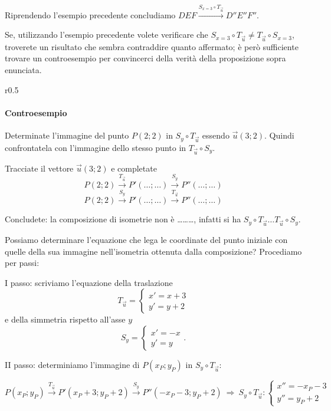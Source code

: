 Riprendendo l'esempio precedente concludiamo $DEF \overset{S_{x=3} 
  \circ T_{\vec{u}}}\longrightarrow D''E''F''$.

Se, utilizzando l'esempio precedente volete verificare che 
$S_{x=3}\circ T_{\vec{u}} \neq T_{\vec{u}}\circ S_{x=3}$, troverete 
un risultato che sembra contraddire quanto affermato; è però 
sufficiente trovare un controesempio per convincerci della verità 
della proposizione sopra enunciata.


\setlength{\intextsep}{3pt plus 2.0pt minus 2.0pt}
\begin{wrapfigure}{r}{0.5\textwidth}
  \centering
\end{wrapfigure}
\paragraph{Controesempio}
Determinate l'immagine del punto $P(2;2)$ in $S_y \circ T_{\vec{u}}$ 
essendo $\vec{u}(3;2)$. Quindi confrontatela con l'immagine dello 
stesso punto in $T_{\vec{u}}\circ S_y$.\vspace{7pt}

Tracciate il vettore $\vec{u}(3;2)$ e completate
\[P(2;2) \overset{T_{\vec{u}}}\rightarrow P'(\ldots{};\ldots{}) 
\overset{S_y}\rightarrow P''(\ldots{};\ldots{})\]
\[P(2;2) \overset{S_y}\rightarrow P'(\ldots{};\ldots{}) 
\overset{T_{\vec{u}}}\rightarrow P''(\ldots{};\ldots{})\]

Concludete: la composizione di isometrie non è \ldots\ldots\ldots{}, 
infatti si ha $S_y \circ T_{\vec{u}} \ldots{} T_{\vec{u}} \circ S_y$.

Possiamo determinare l'equazione che lega le coordinate del punto 
iniziale con quelle della sua immagine nell'isometria ottenuta dalla 
composizione? Procediamo per passi:

I passo: scriviamo l'equazione della traslazione 
\[T_{\vec{u}}=\begin{cases}x'=x+3\\y'=y+2\end{cases}\]
\indent e della simmetria rispetto all'asse $y$ 
\[S_y=\begin{cases}x'=-x\\y'=y\end{cases}.\]

II passo: determiniamo l'immagine di $P(x_P;y_P)$ in $S_y \circ 
T_{\vec{u}}$:

\[P(x_P;y_P)\overset{T_{\vec{u}}}\rightarrow P'(x_P+3;y_P+2) 
\overset{S_y}\rightarrow P''(-x_P-3;y_P+2)\:\Rightarrow\: S_y\circ 
T_{\vec{u}}:\begin{cases}x''=-x_P-3\\ y''=y_P+2\end{cases}\]

